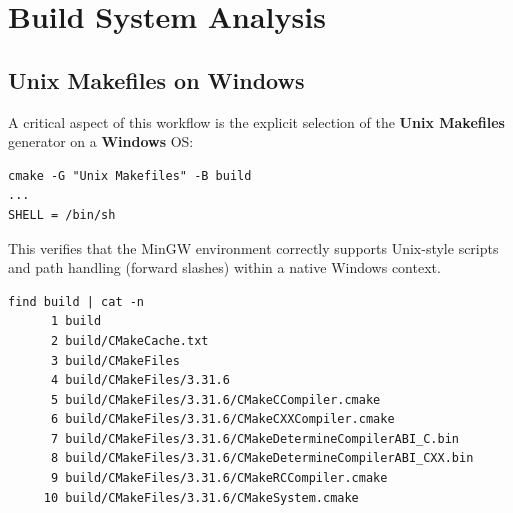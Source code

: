 \section{Build System Analysis}

\subsection{Unix Makefiles on Windows}
A critical aspect of this workflow is the explicit selection of the \textbf{Unix Makefiles} generator on a \textbf{Windows} OS:

\begin{verbatim}
cmake -G "Unix Makefiles" -B build
...
SHELL = /bin/sh
\end{verbatim}

This verifies that the MinGW environment correctly supports Unix-style scripts and path handling (forward slashes) within a native Windows context.

\begin{verbatim}
find build | cat -n 
      1	build
      2	build/CMakeCache.txt
      3	build/CMakeFiles
      4	build/CMakeFiles/3.31.6
      5	build/CMakeFiles/3.31.6/CMakeCCompiler.cmake
      6	build/CMakeFiles/3.31.6/CMakeCXXCompiler.cmake
      7	build/CMakeFiles/3.31.6/CMakeDetermineCompilerABI_C.bin
      8	build/CMakeFiles/3.31.6/CMakeDetermineCompilerABI_CXX.bin
      9	build/CMakeFiles/3.31.6/CMakeRCCompiler.cmake
     10	build/CMakeFiles/3.31.6/CMakeSystem.cmake
\end{verbatim}

